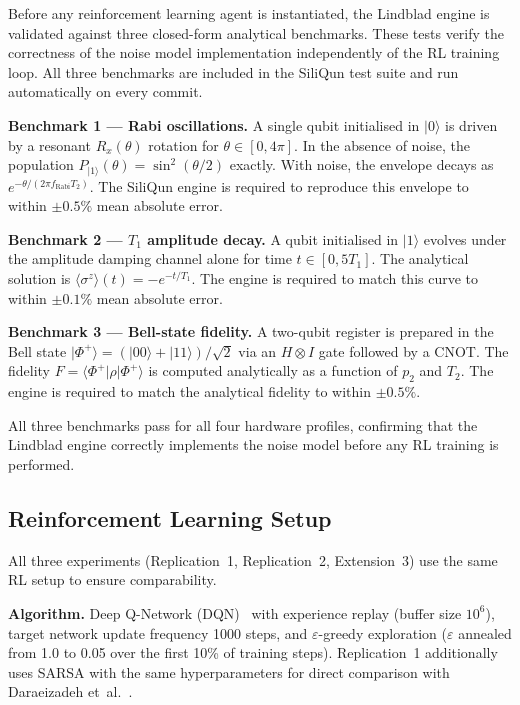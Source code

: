 Before any reinforcement learning agent is instantiated, the Lindblad engine
is validated against three closed-form analytical benchmarks. These tests
verify the correctness of the noise model implementation independently of
the RL training loop. All three benchmarks are included in the SiliQun test
suite and run automatically on every commit.

\textbf{Benchmark 1 — Rabi oscillations.}
A single qubit initialised in $|0\rangle$ is driven by a resonant $R_x(\theta)$
rotation for $\theta \in [0, 4\pi]$. In the absence of noise, the population
$P_{|1\rangle}(\theta) = \sin^2(\theta/2)$ exactly. With noise, the envelope
decays as $e^{-\theta/(2\pi f_\text{Rabi} T_2)}$. The SiliQun engine is
required to reproduce this envelope to within $\pm 0.5\%$ mean absolute error.

\textbf{Benchmark 2 — $T_1$ amplitude decay.}
A qubit initialised in $|1\rangle$ evolves under the amplitude damping channel
alone for time $t \in [0, 5T_1]$. The analytical solution is
$\langle\sigma^z\rangle(t) = -e^{-t/T_1}$. The engine is required to match
this curve to within $\pm 0.1\%$ mean absolute error.

\textbf{Benchmark 3 — Bell-state fidelity.}
A two-qubit register is prepared in the Bell state
$|\Phi^+\rangle = (|00\rangle + |11\rangle)/\sqrt{2}$ via an $H \otimes I$
gate followed by a CNOT. The fidelity
$F = \langle\Phi^+|\rho|\Phi^+\rangle$ is computed analytically as a function
of $p_2$ and $T_2$. The engine is required to match the analytical fidelity
to within $\pm 0.5\%$.

All three benchmarks pass for all four hardware profiles, confirming that the
Lindblad engine correctly implements the noise model before any RL training
is performed.

\subsection{Reinforcement Learning Setup}
\label{subsec:methods_rl}

All three experiments (Replication~1, Replication~2, Extension~3) use the
same RL setup to ensure comparability.

\textbf{Algorithm.} Deep Q-Network (DQN)~\cite{Mnih2015} with experience
replay (buffer size $10^6$), target network update frequency 1000 steps,
and $\varepsilon$-greedy exploration ($\varepsilon$ annealed from 1.0 to 0.05
over the first 10\% of training steps). Replication~1 additionally uses SARSA
with the same hyperparameters for direct comparison with Daraeizadeh
et~al.~\cite{Daraeizadeh2020}.

